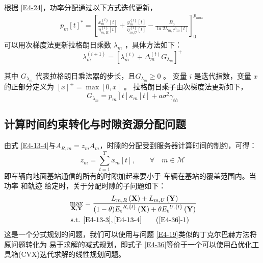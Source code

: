 根据 \eqref{E4-24}，功率分配通过以下方式迭代更新，
\begin{align} \label{E4-26}
{{p}_{m}}{{\left[ t \right]}^{*}}=\left[ \frac{x_{m}^{\left\{ l \right\}}\left[ t \right]}{\eta _{m,R}^{\left\{ l \right\}}\left[ t \right]}+\frac{y_{m}^{\left\{ l \right\}}\left[ t \right]}{\eta _{m,U}^{\left\{ l \right\}}\left[ t \right]}-\frac{{{B}_{0}}}{\ln 2{{\lambda }_{m,t}}{{c}_{m}}\left[ t \right]} \right]_{0}^{{{p}_{max}}\ }
\end{align}
可以用次梯度法更新拉格朗日乘数 $\lambda_m$ ，具体方法如下：
\begin{equation}\label{E4-27}
\lambda _{m}^{\left( i+1 \right)}={{\left[ \lambda _{m}^{\left( t \right)}+\Delta _{m}^{\left( t \right)}{{G}_{{{\lambda}_{m}}}} \right]}^{+}}
\end{equation}

其中 ${{G}_{{{\lambda}_{m}}}}$ 代表拉格朗日乘法器的步长，且${{G}_{{{\lambda}_{m}}}}\geq0$ 。
变量 $i$ 是迭代指数，变量 $x$ 的正部分定义为 $\left[x\right]^+=\max{\left[0,x\right]} $ 。
拉格朗日乘子由次梯度法更新如下，
\begin{equation}\label{E4-28}
{{G}_{{{\lambda }_{m}}}}={{p}_{m}}\left[ t \right]{{\kappa }_{m}}\left[ t \right]+a{{\sigma }^{2}}{{\gamma }_{th}}
\end{equation}
\subsection{计算时间约束转化与时隙资源分配问题}\label{section4-3-3}
由式 \eqref{E4-13-4}与$A_{R,m}={{z}_{m}}A_m$，时隙的分配受到服务器计算时间的制约，可得：
\begin{equation} \label{E4-35}
{{z}_{m}}=\underset{t=1}{\overset{T}{\mathop{\sum }}}{{x}_{m}}\left[ t \right]   ,\qquad\forall \!\!\!\!\!\! \quad m \in \mathcal{M}
\end{equation}
即车辆向地面基站通信的所有的时隙加起来要小于
车辆在基站的覆盖范围内。当功率 和轨迹 {}给定时，关于分配时隙的子问题如下：
\begin{align} \label{E4-36}
\max _{ \mathbf{X},\mathbf{Y}}  &  ={\frac{{{L}_{m,R}\left( \mathbf{X} \right)+{{L}_{m,U}}\left( \mathbf{Y} \right)}}
{(1-\theta){{E}_{\text{t}}}^{R,\left\{ l \right\}}\left( \mathbf{X} \right)+\theta{{E}_{\text{t}}}^{U,\left\{ l \right\}}\left( \mathbf{Y} \right)}}     \\
\text { s.t. }
& \eqref{E4-13-3},\eqref{E4-13-4}                                                        \tag{\ref{E4-36}{-1}}           \label{E4-36-1}
\end{align}
这是一个分式规划的问题，我们可以使用与问题 \eqref{E4-19}类似的丁克尔巴赫方法将原问题转化为
易于求解的减式规划，即式子 \eqref{E4-36}等价于一个可以使用凸优化工具箱(CVX)迭代求解的线性规划问题。
